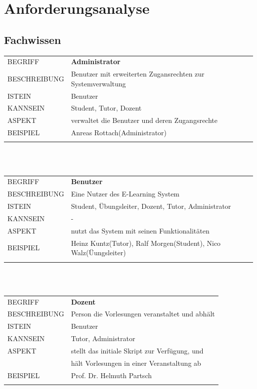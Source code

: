 \documentclass[12pt,a4paper]{article}
\begin{document}
\section{Anforderungsanalyse}
\subsection{Fachwissen}
\begin{tabular}{l p{12cm}}  
BEGRIFF 	 & \textbf{Administrator} \\ 
BESCHREIBUNG & Benutzer mit erweiterten Zugansrechten zur Systemverwaltung\\ 
ISTEIN   	 & Benutzer \\
KANNSEIN 	 & Student, Tutor, Dozent \\ 
ASPEKT   	 & verwaltet die Benutzer und deren Zugangsrechte\\
BEISPIEL 	 & Anreas Rottach(Administrator)\\\\
\hline
\end{tabular}\\\\  

\begin{tabular}{l p{12cm}}
BEGRIFF 	 & \textbf{Benutzer} \\ 
BESCHREIBUNG & Eine Nutzer des E-Learning System \\ 
ISTEIN   	 & Student, Übungsleiter, Dozent, Tutor, Administrator \\
KANNSEIN 	 &   - \\ 
ASPEKT   	 & nutzt das System mit seinen Funktionalitäten\\
BEISPIEL 	 & Heinz Kuntz(Tutor), Ralf Morgen(Student), Nico Walz(Üungsleiter)\\\\
\hline
\end{tabular}\\\\    

\begin{tabular}{l p{12cm}}
BEGRIFF 	 & \textbf{Dozent} \\ 
BESCHREIBUNG & Person die Vorlesungen veranstaltet und abhält \\ 
ISTEIN   	 & Benutzer\\
KANNSEIN 	 & Tutor, Administrator \\ 
ASPEKT   	 & stellt das initiale Skript zur Verfügung, und\\
			 &  hält Vorlesungen in einer Veranstaltung ab\\
BEISPIEL 	 & Prof. Dr. Helmuth Partsch\\\\
\hline
\end{tabular}\\\\   
\end{document}
